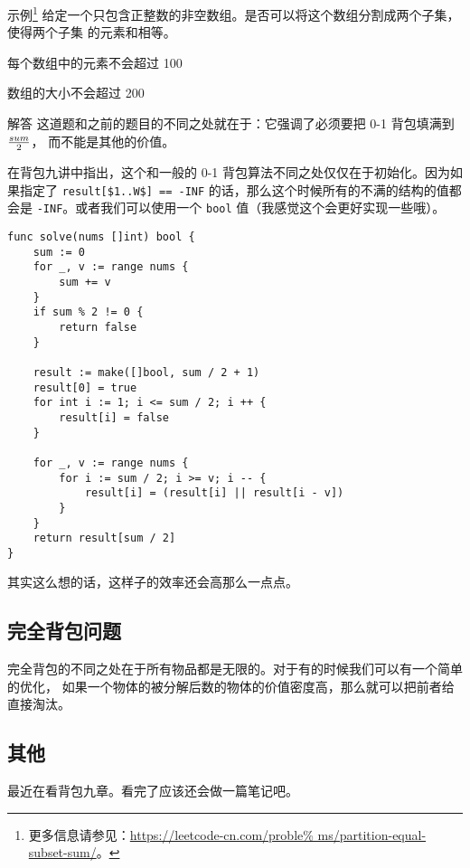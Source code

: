 \begin{Exple}{示例\footnote{更多信息请参见：\url{https://leetcode-cn.com/proble%
ms/partition-equal-subset-sum/}。}}
给定一个只包含正整数的非空数组。是否可以将这个数组分割成两个子集，使得两个子集
的元素和相等。


每个数组中的元素不会超过 100

数组的大小不会超过 200
\end{Exple}
\begin{Exple}{解答}
这道题和之前的题目的不同之处就在于：它强调了必须要把 0-1 背包填满到$sum \over 2$，
而不能是其他的价值。

在背包九讲中指出，这个和一般的 0-1 背包算法不同之处仅仅在于初始化。因为如果指定了
\verb|result[$1..W$] == -INF| 的话，那么这个时候所有的不满的结构的值都会是 %
\verb|-INF|。或者我们可以使用一个 \verb|bool| 值（我感觉这个会更好实现一些哦）。
\begin{lstlisting}
func solve(nums []int) bool {
    sum := 0
    for _, v := range nums {
        sum += v
    }
    if sum % 2 != 0 {
        return false
    }

    result := make([]bool, sum / 2 + 1)
    result[0] = true
    for int i := 1; i <= sum / 2; i ++ {
        result[i] = false
    }

    for _, v := range nums {
        for i := sum / 2; i >= v; i -- {
            result[i] = (result[i] || result[i - v])
        }
    }
    return result[sum / 2]
}
\end{lstlisting}

其实这么想的话，这样子的效率还会高那么一点点。
\end{Exple}

\subsection{完全背包问题}

完全背包的不同之处在于所有物品都是无限的。对于有的时候我们可以有一个简单的优化，
如果一个物体的被分解后数的物体的价值密度高，那么就可以把前者给直接淘汰。

\subsection{其他}

最近在看背包九章。看完了应该还会做一篇笔记吧。


